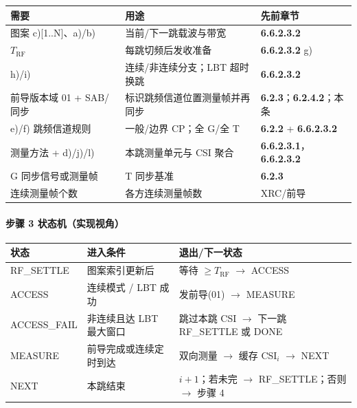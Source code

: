 \documentclass[11pt,a4paper]{ctexart}
\begin{document}
\begin{center}
\small
\begin{tabular}{|L{3.5cm}|L{4.5cm}|L{5cm}|}
\hline
\textbf{需要} & \textbf{用途} & \textbf{先前章节} \\
\hline
图案 c)[1..N]、a)/b) & 当前/下一跳载波与带宽 & \textbf{6.6.2.3.2} \\
\hline
$T_{\mathrm{RF}}$ & 每跳切频后发收准备 & \textbf{6.6.2.3.2} g) \\
\hline
h)/i) & 连续/非连续分支；LBT 超时换跳 & \textbf{6.6.2.3.2} \\
\hline
前导版本域 01 + SAB/同步 & 标识跳频信道位置测量帧并再同步 & \textbf{6.2.3}；\textbf{6.2.4.2}；本条 \\
\hline
e)/f) 跳频信道规则 & 一般/边界 CP；全 G/全 T & \textbf{6.2.2} + \textbf{6.6.2.3.2} \\
\hline
测量方法 + d)/j)/l) & 本跳测量单元与 CSI 聚合 & \textbf{6.6.2.3.1}，\textbf{6.6.2.3.2} \\
\hline
G 同步信号或测量帧 & T 同步基准 & \textbf{6.2.3} \\
\hline
连续测量帧个数 & 各方连续测量帧数 & XRC/前导 \\
\hline
\end{tabular}
\end{center}

\paragraph{步骤 3 状态机（实现视角）}
\begin{center}
\small
\begin{tabular}{|L{2.8cm}|L{5.5cm}|L{4.5cm}|}
\hline
\textbf{状态} & \textbf{进入条件} & \textbf{退出/下一状态} \\
\hline
RF\_SETTLE & 图案索引更新后 & 等待 $\ge T_{\mathrm{RF}}$ $\rightarrow$ ACCESS \\
\hline
ACCESS & 连续模式 / LBT 成功 & 发前导(01) $\rightarrow$ MEASURE \\
\hline
ACCESS\_FAIL & 非连续且达 LBT 最大窗口 & 跳过本跳 CSI $\rightarrow$ 下一跳 RF\_SETTLE 或 DONE \\
\hline
MEASURE & 前导完成或连续定时到达 & 双向测量 $\rightarrow$ 缓存 CSI$_i$ $\rightarrow$ NEXT \\
\hline
NEXT & 本跳结束 & $i{+}1$；若未完 $\rightarrow$ RF\_SETTLE；否则 $\rightarrow$ 步骤 4 \\
\hline
\end{tabular}
\end{center}
\end{document}
